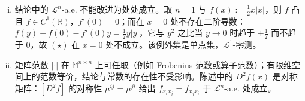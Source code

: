 \documentclass[../../main.tex]{subfiles}%
\begin{document}
\begin{remark}
\begin{enumerate}[(i)]
\item 结论中的 $\mathcal{L}^{n}$-a.e. 不能改进为处处成立。取 $n=1$ 与 $f(x):=\frac{1}{2}x\lvert x\rvert$，则 $f$ 凸且 $f\in C^{1}(\mathbb{R})$，$f'(0)=0$；而在 $x=0$ 处不存在二阶导数：$f(y)-f(0)-f'(0)y=\frac{1}{2}y\lvert y\rvert$，它与 $y^{2}$ 之比当 $y\to0$ 时趋于 $\pm\frac{1}{2}$ 而不趋于 $0$，故 $(\star)$ 在 $x=0$ 处不成立。该例外集是单点集，$\mathcal{L}^{1}$-零测。
\item 矩阵范数 $\lvert\cdot\rvert$ 在 $\mathbb{M}^{n\times n}$ 上可任取（例如 Frobenius 范数或算子范数）；有限维空间上的范数等价，结论与常数的存在性不受影响。陈述中的 $D^{2}f(x)$ 是对称矩阵：$[D^{2}f]$ 的对称性 $\mu^{ij}=\mu^{ji}$ 给出 $f_{x_{i}x_{j}}=f_{x_{j}x_{i}}$ 于 $\mathcal{L}^{n}$-a.e. 处成立。
\end{enumerate}
\end{remark}
\end{document}
